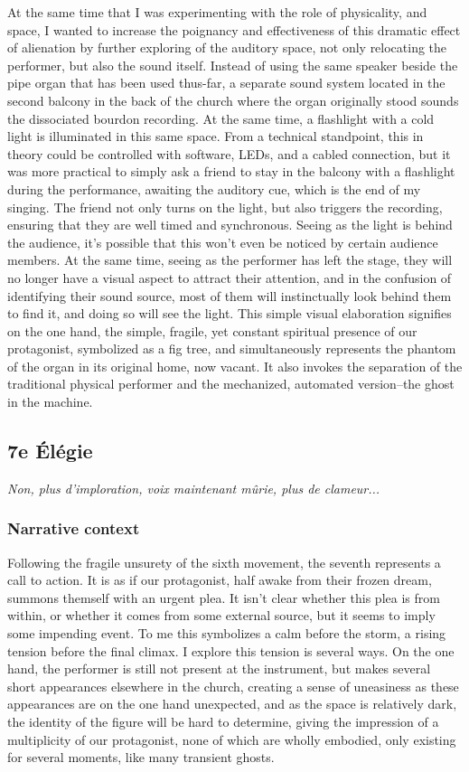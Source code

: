 \documentclass[12pt,twoside,maitrise]{dms}
\theoremstyle{definition}
\begin{document}
At the same time that I was experimenting with the role of physicality, and space, I wanted to increase the poignancy and effectiveness of this dramatic effect of alienation by further exploring of the auditory space, not only relocating the performer, but also the sound itself.
Instead of using the same speaker beside the pipe organ that has been used thus-far, a separate sound system located in the second balcony in the back of the church where the organ originally stood sounds the dissociated bourdon recording.
At the same time, a flashlight with a cold light is illuminated in this same space.
From a technical standpoint, this in theory could be controlled with software, LEDs, and a cabled connection, but it was more practical to simply ask a friend to stay in the balcony with a flashlight during the performance, awaiting the auditory cue, which is the end of my singing.
The friend not only turns on the light, but also triggers the recording, ensuring that they are well timed and synchronous.
Seeing as the light is behind the audience, it's possible that this won't even be noticed by certain audience members.
At the same time, seeing as the performer has left the stage, they will no longer have a visual aspect to attract their attention, and in the confusion of identifying their sound source, most of them will instinctually look behind them to find it, and doing so will see the light.
This simple visual elaboration signifies on the one hand, the simple, fragile, yet constant spiritual presence of our protagonist, symbolized as a fig tree, and simultaneously represents the phantom of the organ in its original home, now vacant.
It also invokes the separation of the traditional physical performer and the mechanized, automated version--the ghost in the machine.

\subsection{7e Élégie}

\epigraph{\textit{Non, plus d’imploration, voix maintenant mûrie, plus de clameur...}}{}

\subsubsection{Narrative context}

Following the fragile unsurety of the sixth movement, the seventh represents a call to action.
It is as if our protagonist, half awake from their frozen dream, summons themself with an urgent plea.
It isn't clear whether this plea is from within, or whether it comes from some external source, but it seems to imply some impending event.
To me this symbolizes a calm before the storm, a rising tension before the final climax.
I explore this tension is several ways.
On the one hand, the performer is still not present at the instrument, but makes several short appearances elsewhere in the church, creating a sense of uneasiness as these appearances are on the one hand unexpected, and as the space is relatively dark, the identity of the figure will be hard to determine, giving the impression of a multiplicity of our protagonist, none of which are wholly embodied, only existing for several moments, like many transient ghosts.
\end{document}
